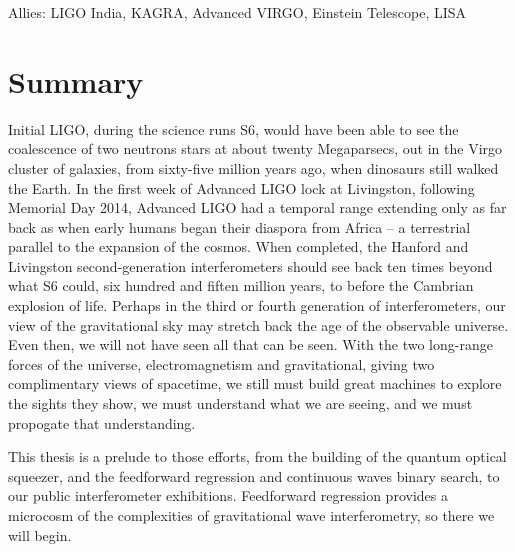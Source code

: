             Allies: LIGO India, KAGRA, Advanced VIRGO, Einstein Telescope, LISA

    \section{Summary}
    \label{intro_summary}
 

Initial LIGO, during the science runs S6, would have been able to see the coalescence of two neutrons stars at about twenty Megaparsecs, out in the Virgo cluster of galaxies, from sixty-five million years ago, when dinosaurs still walked the Earth. 
In the first week of Advanced LIGO lock at Livingston, following Memorial Day 2014, Advanced LIGO had a temporal range extending only as far back as when early humans began their diaspora from Africa -- a terrestrial parallel to the expansion of the cosmos.
When completed, the Hanford and Livingston second-generation interferometers should see back ten times beyond what S6 could, six hundred and fiften million years, to before the Cambrian explosion of life.
Perhaps in the third or fourth generation of interferometers, our view of the gravitational sky may stretch back the age of the observable universe.
Even then, we will not have seen all that can be seen.
With the two long-range forces of the universe, electromagnetism and gravitational, giving two complimentary views of spacetime, we still must build great machines to explore the sights they show, we must understand what we are seeing, and we must propogate that understanding. 

This thesis is a prelude to those efforts, from the building of the quantum optical squeezer, and the feedforward regression and continuous waves binary search, to our public interferometer exhibitions.   
Feedforward regression provides a microcosm of the complexities of gravitational wave interferometry, so there we will begin.


            
%

